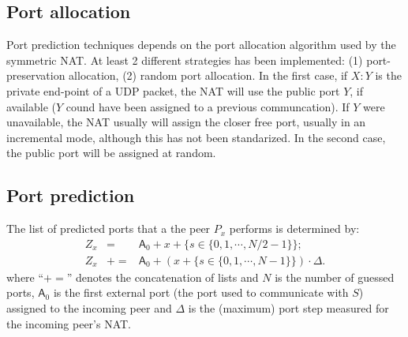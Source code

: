 \subsection{Port allocation}
Port prediction techniques depends on the port allocation algorithm
used by the symmetric NAT. At least 2 different strategies has been
implemented: (1) port-preservation allocation, (2) random port
allocation. In the first case, if $X:Y$ is the private end-point of a
UDP packet, the NAT will use the public port $Y$, if available ($Y$
cound have been assigned to a previous communcation). If $Y$ were
unavailable, the NAT usually will assign the closer free port, usually
in an incremental mode, although this has not been standarized. In the
second case, the public port will be assigned at random.


\subsection{Port prediction}
The list of predicted ports that a the peer $P_x$ performs is
determined by:
\begin{equation}
  \begin{array}{rcl}
    Z_x & = & \textsf{A}_0 + x + \{s\in\{0,1,\cdots,N/2-1\}\}; \\
    Z_x & += & \textsf{A}_0 + (x + \{s\in\{0,1,\cdots, N-1\}\}) \cdot \Delta.
  \end{array}
\end{equation}
where ``$+=$'' denotes the concatenation of lists and $N$ is the
number of guessed ports, $\textsf{A}_0$ is the first external port (the
port used to communicate with $S$) assigned to the incoming peer and
$\Delta$ is the (maximum) port step measured for the incoming peer's
NAT.
